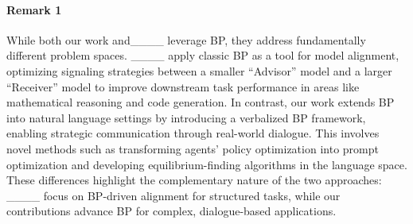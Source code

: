 \paragraph{Remark 1}  

While both our work and____ leverage BP, they address fundamentally different problem spaces. 
____ apply classic BP as a tool for model alignment, optimizing signaling strategies between a smaller ``Advisor'' model and a larger ``Receiver'' model to improve downstream task performance in areas like mathematical reasoning and code generation. 
In contrast, our work extends BP into natural language settings by introducing a verbalized BP framework, enabling strategic communication through real-world dialogue. 
This involves novel methods such as transforming agents' policy optimization into prompt optimization and developing equilibrium-finding algorithms in the language space. 
These differences highlight the complementary nature of the two approaches: ____ focus on BP-driven alignment for structured tasks, while our contributions advance BP for complex, dialogue-based applications.